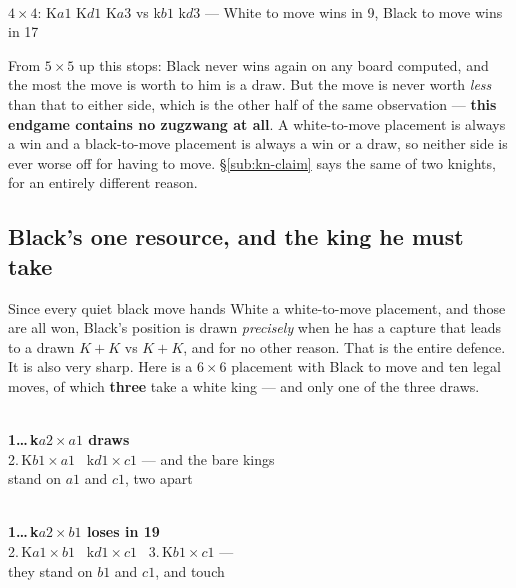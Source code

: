\documentclass[11pt]{article}
\begin{document}
\begin{center}
  \\[1.5mm]
  {\scriptsize\color{inksoft}$4\times4$: K$a1$ K$d1$ K$a3$ vs k$b1$ k$d3$ ---
   White to move wins in 9, Black to move wins in 17}
\end{center}

\noindent
From $5\times5$ up this stops: Black never wins again on any board computed, and
the most the move is worth to him is a draw. But the move is never worth
\emph{less} than that to either side, which is the other half of the same
observation --- \textbf{this endgame contains no zugzwang at all}. A white-to-move
placement is always a win and a black-to-move placement is always a win or a
draw, so neither side is ever worse off for having to move. \S\ref{sub:kn-claim}
says the same of two knights, for an entirely different reason.

\subsection{Black's one resource, and the king he must take}\label{sub:kings-grab}

\noindent
Since every quiet black move hands White a white-to-move placement, and those
are all won, Black's position is drawn \emph{precisely} when he has a capture
that leads to a drawn $K\!+\!K$ vs $K\!+\!K$, and for no other reason. That is
the entire defence. It is also very sharp. Here is a $6\times6$ placement with
Black to move and ten legal moves, of which \textbf{three} take a white king ---
and only one of the three draws.

\smallskip

\begin{minipage}{0.47\textwidth}\centering
  \\[1.5mm]
  {\scriptsize\color{inksoft}\textbf{1\ldots\,k$a2\times a1$ draws}\\
   2.\,K$b1\times a1$ \ k$d1\times c1$ --- and the bare kings\\
   stand on $a1$ and $c1$, two apart}
\end{minipage}\hfill
\begin{minipage}{0.47\textwidth}\centering
  \\[1.5mm]
  {\scriptsize\color{inksoft}\textbf{1\ldots\,k$a2\times b1$ loses in 19}\\
   2.\,K$a1\times b1$ \ k$d1\times c1$ \ 3.\,K$b1\times c1$ ---\\
   they stand on $b1$ and $c1$, and touch}
\end{minipage}
\end{document}
